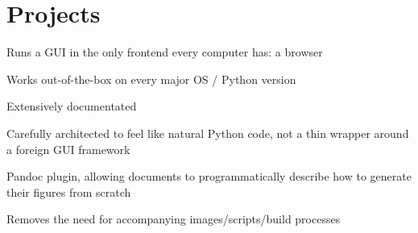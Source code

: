 \section{Projects}

\begin{tightemize}
\item Runs a GUI in the only frontend every computer has: a browser
\item Works out-of-the-box on every major OS / Python version
\item Extensively documentated
\item Carefully architected to feel like natural Python code, not a thin wrapper around a foreign GUI framework
\end{tightemize}

\sectionsep

\begin{tightemize}
\item Pandoc plugin, allowing documents to programmatically describe how to generate their figures from scratch
\item Removes the need for accompanying images/scripts/build processes
\end{tightemize}
\sectionsep
